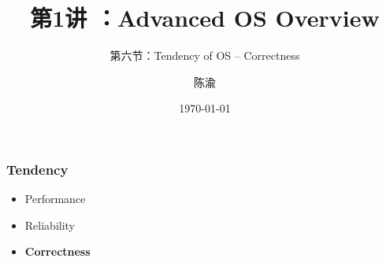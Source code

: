 


\title[第1讲]{第1讲 ：Advanced OS Overview} %
\subtitle{第六节：Tendency of OS -- Correctness}
\author{陈渝} %
\date{\today} %




\begin{frame}
\titlepage %
\end{frame}

%
%
\begin{frame}
	\frametitle{Tendency}

	\begin{itemize}\huge
	\item Performance
	\item Reliability
	\item \textbf{Correctness}
	
\end{itemize}
\end{frame}


